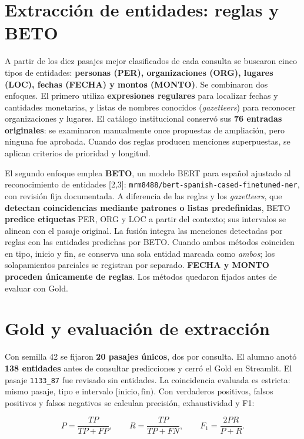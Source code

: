 \documentclass[10pt,a4paper]{article}
\begin{document}

\section{Extracción de entidades: reglas y BETO}
A partir de los diez pasajes mejor clasificados de cada consulta se buscaron cinco tipos de entidades: \textbf{personas (PER), organizaciones (ORG), lugares (LOC), fechas (FECHA) y montos (MONTO)}. Se combinaron dos enfoques. El primero utiliza \textbf{expresiones regulares} para localizar fechas y cantidades monetarias, y listas de nombres conocidos (\emph{gazetteers}) para reconocer organizaciones y lugares. El catálogo institucional conservó sus \textbf{76 entradas originales}: se examinaron manualmente once propuestas de ampliación, pero ninguna fue aprobada. Cuando dos reglas producen menciones superpuestas, se aplican criterios de prioridad y longitud.

El segundo enfoque emplea \textbf{BETO}, un modelo BERT para español ajustado al reconocimiento de entidades [2,3]: \texttt{mrm8488/bert-spanish-cased-finetuned-ner}, con revisión fija documentada. A diferencia de las reglas y los \emph{gazetteers}, que \textbf{detectan coincidencias mediante patrones o listas predefinidas}, BETO \textbf{predice etiquetas} PER, ORG y LOC a partir del contexto; sus intervalos se alinean con el pasaje original. La fusión integra las menciones detectadas por reglas con las entidades predichas por BETO. Cuando ambos métodos coinciden en tipo, inicio y fin, se conserva una sola entidad marcada como \emph{ambos}; los solapamientos parciales se registran por separado. \textbf{FECHA y MONTO proceden únicamente de reglas}. Los métodos quedaron fijados antes de evaluar con Gold.

\section{Gold y evaluación de extracción}
Con semilla 42 se fijaron \textbf{20 pasajes únicos}, dos por consulta. El alumno anotó \textbf{138 entidades} antes de consultar predicciones y cerró el Gold en Streamlit. El pasaje \texttt{1133\_87} fue revisado sin entidades. La coincidencia evaluada es estricta: mismo pasaje, tipo e intervalo \([\mathrm{inicio},\mathrm{fin})\). Con verdaderos positivos, falsos positivos y falsos negativos se calculan precisión, exhaustividad y F1:

\begin{equation}
P=\frac{TP}{TP+FP},\qquad R=\frac{TP}{TP+FN},\qquad F_1=\frac{2PR}{P+R}.
\end{equation}
\end{document}
